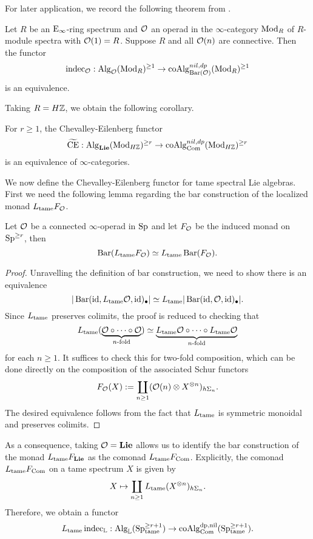 For later application, we record the following theorem from \cite{Ching-Harper}.
\begin{theorem}
\cite{Ching-Harper}
\label{Ching-Harper's Koszul duality}
	Let $R$ be an $\operatorname{E}_{\infty}$-ring spectrum and ${\mathcal{O}}$ an operad in the $\infty$-category $\operatorname{Mod}_R$ of $R$-module spectra with ${\mathcal{O}}(1)=R$. Suppose $R$ and all ${\mathcal{O}}(n)$ are connective. Then the functor 
	\[
	\operatorname{indec}_{{\mathcal{O}}}: \operatorname{Alg}_{{\mathcal{O}}}(\operatorname{Mod}_R)^{\geq 1} \to \operatorname{coAlg}^{nil, dp}_{\operatorname{Bar}({\mathcal{O}})}(\operatorname{Mod}_R)^{\geq 1}
	\]
	 is an equivalence.
\end{theorem}

Taking $R=H{\mathbb{Z}}$, we obtain the following corollary.
\begin{corollary}
	For $r\geq 1$, the Chevalley-Eilenberg functor 
	\[
	\widetilde{\operatorname{CE}}: \operatorname{Alg}_{\mathbf{Lie}}(\operatorname{Mod}_{H{\mathbb{Z}}})^{\geq r} \to \operatorname{coAlg}^{nil, dp}_{\operatorname{Com}}(\operatorname{Mod}_{H{\mathbb{Z}}})^{\geq r}
	\]
	is an equivalence of $\infty$-categories.
\end{corollary}


We now define the Chevalley-Eilenberg functor for tame spectral Lie algebras. First we need the following lemma regarding the bar construction of the localized monad $L_{\operatorname{\operatorname{tame}}}F_{{\mathcal{O}}}$.
\begin{lemma}
    Let ${\mathcal{O}}$ be a connected $\infty$-operad in $ \operatorname{Sp}$ and let $F_{{\mathcal{O}}}$ be the induced monad on $\operatorname{Sp}^{\geq r}$,
    then 
    $$
    \operatorname{Bar}(L_{\operatorname{\operatorname{tame}}}F_{\mathcal{O}} ) \simeq L_{\operatorname{\operatorname{tame}}} \operatorname{Bar}(F_{\mathcal{O}}).
    $$
\end{lemma}
\begin{proof}
    Unravelling the definition of bar construction, we need to show there is an equivalence
    $$
     |\operatorname{Bar}(\operatorname{id}, L_{\operatorname{\operatorname{tame}}}{\mathcal{O}} , \operatorname{id})_{\bullet}|
     \simeq
     L_{\operatorname{\operatorname{tame}}}|\operatorname{Bar}(\operatorname{id}, {\mathcal{O}} , \operatorname{id})_{\bullet}|.
    $$
    Since $L_{\operatorname{\operatorname{tame}}}$ preserves colimits, the proof is reduced to checking that
    $$
    L_{\operatorname{\operatorname{tame}}} (\underbrace{{\mathcal{O}} \circ \cdots \circ {\mathcal{O}}}_{\text{$n$-fold}} )
    \simeq 
    \underbrace{ L_{\operatorname{\operatorname{tame}}}{\mathcal{O}} \circ \cdots \circ  L_{\operatorname{\operatorname{tame}}}{\mathcal{O}}}_{\text{$n$-fold}} 
    $$
    for each $n\geq 1$.
    It suffices to check this for two-fold composition, which can be done directly on the composition of the associated Schur functors
    $$
    F_{{\mathcal{O}}}(X):= \coprod_{n\geq 1} ({\mathcal{O}}(n) \otimes X^{\otimes n})_{h\Sigma_n}.
    $$ 
    The desired equivalence follows from the fact that $L_{\operatorname{\operatorname{tame}}}$ is symmetric monoidal and preserves colimits.
\end{proof}

As a consequence, taking ${\mathcal{O}}=\mathbf{Lie}$ allows us to identify the bar construction of the monad $L_{\operatorname{\operatorname{tame}}}F_{\mathbf{Lie}}$ as the comonad $L_{\operatorname{\operatorname{tame}}}F_{\operatorname{Com}}$. Explicitly, the comonad $L_{\operatorname{\operatorname{tame}}}F_{\operatorname{Com}}$ on a tame spectrum $X$ is given by
$$
X \mapsto \coprod_{n\geq 1} L_{\operatorname{\operatorname{tame}}} (X^{\otimes n})_{h\Sigma_n}.
$$
Therefore, we obtain a functor 
$$
L_{\operatorname{\operatorname{tame}}} \operatorname{indec}_{{\mathbb{L}}}:
\operatorname{Alg}_{{\mathbb{L}}}(\operatorname{Sp}^{\geq r+1}_{\operatorname{\operatorname{tame}}})
\to
\operatorname{coAlg}^{\operatorname{dp}, \operatorname{nil}}_{\operatorname{Com}}(\operatorname{Sp}^{\geq r+1}_{\operatorname{\operatorname{tame}}}).
$$

